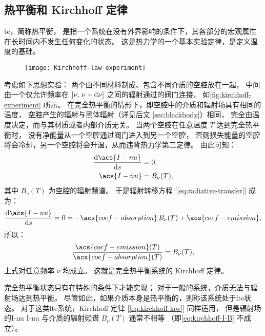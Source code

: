 \subsection{热平衡和 Kirchhoff 定律}

\acf{te}，简称热平衡，
是指一个系统在没有外界影响的条件下，其各部分的宏观属性在长时间内不发生任何变化的状态。
这是热力学的一个基本实验定律，是定义温度的基础。

\begin{figure}[htp]
  \centering
  \texttt{[image: Kirchhoff-law-experiment]}
  \label{fig:kirchhoff-experiment}
\end{figure}

考虑如下思想实验：
两个由不同材料制成、包含不同介质的空腔放在一起，
中间由一个仅允许频率在 $[\nu, \,\nu+\mathrm{d}\nu]$ 之间的辐射通过的阀门连接，
如\autoref{fig:kirchhoff-experiment} 所示。
在完全热平衡的情形下，即空腔中的介质和辐射场具有相同的温度，
空腔产生的辐射与黑体辐射（详见后文 \autoref{sec:blackbody}）相同，
完全由温度决定，而与其材质或者内部介质无关。
当两个空腔在任意温度 $T$ 达到完全热平衡时，
没有净能量从一个空腔通过阀门进入到另一个空腔，
否则损失能量的空腔将会冷却，另一个空腔将会升温，从而违背热力学第二定律。
由此可知：
\begin{align}
  \diff{\acs{I-nu}}{s} & = 0 , \\
  \acs{I-nu} & = B_{\nu}(T) ,
  \label{eq:kirchhoff-I-B}
\end{align}
其中 $B_{\nu}(T)$ 为空腔的辐射频谱。
于是辐射转移方程 [\autoref{eq:radiative-transfer}] 成为：
\begin{equation}
  \diff{\acs{I-nu}}{s} = 0
    = - \acs{coef-absorption} \,B_{\nu}(T) + \acs{coef-emission} ,
\end{equation}
所以：
\begin{equation}
  \label{eq:kirchhoff-law}
  \frac{\acs{coef-emission}(T)}{\acs{coef-absorption}(T)} = B_{\nu}(T) ,
\end{equation}
上式对任意频率 $\nu$ 均成立。
这就是完全热平衡系统的 Kirchhoff 定律。

完全热平衡状态只有在特殊的条件下才能实现；
对于一般的系统，介质无法与辐射场达到热平衡。
尽管如此，如果介质本身是热平衡的，则称该系统处于\acf{lte}状态。
对于这类\acf{lte}系统，Kirchhoff 定律 [\autoref{eq:kirchhoff-law}] 同样适用，
但是辐射场的\acl{I-nu} \ac{I-nu} 与介质的辐射频谱 $B_{\nu}(T)$ 通常不相等
（即\autoref{eq:kirchhoff-I-B} 不成立）。

